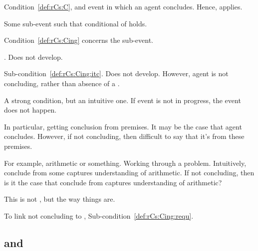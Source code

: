 \begin{note}
  Condition~\ref{def:rCs:C}, and event in which an agent concludes.
  Hence, \qWhyV{} applies.

  Some sub-event such that conditional of \qWhyV{} holds.

  Condition~\ref{def:rCs:Cing} concerns the sub-event.

  \ros{}.
  Does not develop.

  Sub-condition~\ref{def:rCs:Cing:itc}.
  Does not develop.
  However, agent is not concluding, rather than absence of a \ros{}.

  A strong condition, but an intuitive one.
  If event is not in progress, the event does not happen.

  In particular, getting conclusion from premises.
  It may be the case that agent concludes.
  However, if not concluding, then difficult to say that it's from these premises.

  For example, arithmetic or something.
  Working through a problem.
  Intuitively, conclude from some \pool{} captures understanding of arithmetic.
  If not concluding, then is it the case that conclude from \pool{} captures understanding of arithmetic?

  This is not \agpe{}, but the way things are.

  To link not concluding to \ros{}, Sub-condition~\ref{def:rCs:Cing:requ}.
\end{note}

\subsection{ and \qWhyV{}}

